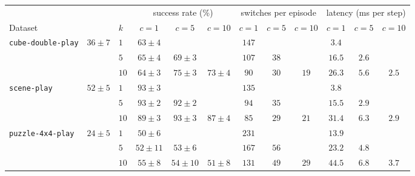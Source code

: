 \begin{tabular}{lcl|ccc|ccc|ccc}
\toprule
 & & & \multicolumn{3}{c|}{success rate (\%)} & \multicolumn{3}{c|}{switches per episode} & \multicolumn{3}{c}{latency (ms per step)} \\
Dataset & \bestfixed{} & $k$ & $c{=}1$ & $c{=}5$ & $c{=}10$ & $c{=}1$ & $c{=}5$ & $c{=}10$ & $c{=}1$ & $c{=}5$ & $c{=}10$ \\
\midrule
\multirow{3}{*}{\texttt{cube-double-play}} & \multirow{3}{*}{$36 \pm 7$} & $1$ & $63 \pm 4$ &  &  & $147$ &  &  & $3.4$ &  &  \\
 &  & $5$ & $65 \pm 4$ & \underline{$69 \pm 3$} &  & $107$ & $38$ &  & $16.5$ & $2.6$ &  \\
 &  & $10$ & $64 \pm 3$ & $75 \pm 3$ & $73 \pm 4$ & $90$ & $30$ & $19$ & $26.3$ & $5.6$ & $2.5$ \\
\midrule
\multirow{3}{*}{\texttt{scene-play}} & \multirow{3}{*}{$52 \pm 5$} & $1$ & $93 \pm 3$ &  &  & $135$ &  &  & $3.8$ &  &  \\
 &  & $5$ & $93 \pm 2$ & $92 \pm 2$ &  & $94$ & $35$ &  & $15.5$ & $2.9$ &  \\
 &  & $10$ & $89 \pm 3$ & $93 \pm 3$ & \underline{$87 \pm 4$} & $85$ & $29$ & $21$ & $31.4$ & $6.3$ & $2.9$ \\
\midrule
\multirow{3}{*}{\texttt{puzzle-4x4-play}} & \multirow{3}{*}{$24 \pm 5$} & $1$ & $50 \pm 6$ &  &  & $231$ &  &  & $13.9$ &  &  \\
 &  & $5$ & $52 \pm 11$ & $53 \pm 6$ &  & $167$ & $56$ &  & $23.2$ & $4.8$ &  \\
 &  & $10$ & $55 \pm 8$ & $54 \pm 10$ & \underline{$51 \pm 8$} & $131$ & $49$ & $29$ & $44.5$ & $6.8$ & $3.7$ \\
\bottomrule
\end{tabular}
